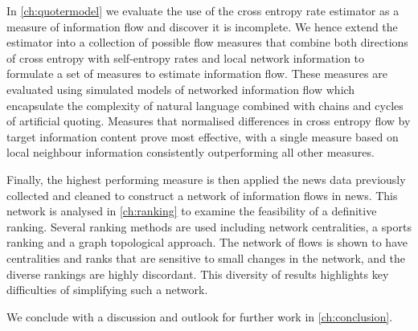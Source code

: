 In \autoref{ch:quotermodel} we evaluate the use of the cross entropy rate estimator as a measure of information flow and discover it is incomplete. We hence extend the estimator into a collection of possible flow measures that combine both directions of cross entropy with self-entropy rates and local network information to formulate a set of measures to estimate information flow. These measures are evaluated using simulated models of networked information flow which encapsulate the complexity of natural language combined with chains and cycles of artificial quoting. Measures that normalised differences in cross entropy flow by target information content prove most effective, with a single measure based on local neighbour information consistently outperforming all other measures.

Finally, the highest performing measure is then applied the news data previously collected and cleaned to construct a network of information flows in news. This network is analysed in \autoref{ch:ranking} to examine the feasibility of a definitive ranking. Several ranking methods are used including network centralities, a sports ranking and a graph topological approach. The network of flows is shown to have centralities and ranks that are sensitive to small changes in the network, and the diverse rankings are highly discordant. This diversity of results highlights key difficulties of simplifying such a network. 

We conclude with a discussion and outlook for further work in \autoref{ch:conclusion}.


